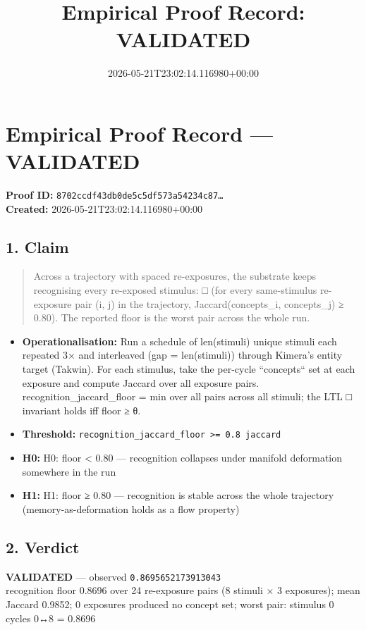 \documentclass{article}
\title{Empirical Proof Record: VALIDATED}
\date{2026-05-21T23:02:14.116980+00:00}
\begin{document}
\maketitle
\section*{Empirical Proof Record --- \textcolor{validated}{\textbf{VALIDATED}}}
\textbf{Proof ID:} \texttt{8702ccdf43db0de5c5df573a54234c87\dots}\\
\textbf{Created:} 2026-05-21T23:02:14.116980+00:00
\subsection*{1. Claim}
\begin{quote}Across a trajectory with spaced re-exposures, the substrate keeps recognising every re-exposed stimulus: □ (for every same-stimulus re-exposure pair (i, j) in the trajectory, Jaccard(concepts\_i, concepts\_j) ≥ 0.80). The reported floor is the worst pair across the whole run.\end{quote}
\begin{itemize}
\item \textbf{Operationalisation:} Run a schedule of len(stimuli) unique stimuli each repeated 3× and interleaved (gap = len(stimuli)) through Kimera's entity target (Takwin). For each stimulus, take the per-cycle ``concepts`` set at each exposure and compute Jaccard over all exposure pairs. recognition\_jaccard\_floor = min over all pairs across all stimuli; the LTL □ invariant holds iff floor ≥ θ.
\item \textbf{Threshold:} \texttt{recognition\_jaccard\_floor >= 0.8 jaccard}
\item \textbf{H0:} H0: floor < 0.80 — recognition collapses under manifold deformation somewhere in the run
\item \textbf{H1:} H1: floor ≥ 0.80 — recognition is stable across the whole trajectory (memory-as-deformation holds as a flow property)
\end{itemize}
\subsection*{2. Verdict}
\textcolor{validated}{\textbf{VALIDATED}} --- observed \texttt{0.8695652173913043}\\
recognition floor 0.8696 over 24 re-exposure pairs (8 stimuli × 3 exposures); mean Jaccard 0.9852; 0 exposures produced no concept set; worst pair: stimulus 0 cycles 0↔8 = 0.8696
\end{document}
